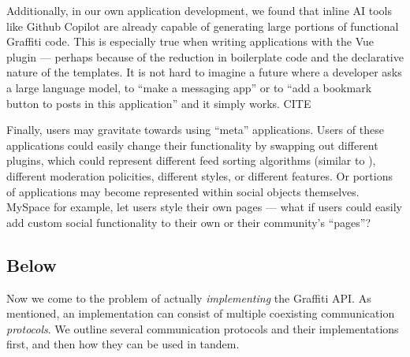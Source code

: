 Additionally, in our own application development,
we found that inline AI tools like Github Copilot are already
capable of generating large portions of functional Graffiti code.
This is especially true when writing applications with the
Vue plugin --- perhaps because of the reduction in boilerplate
code and the declarative nature of the templates.
It is not hard to imagine a future where a developer asks
a large language model, to ``make a messaging app''
or to ``add a bookmark button to posts in this application'' and
it simply works. CITE

Finally, users may gravitate towards using ``meta'' applications.
Users of these applications could easily change their functionality
by swapping out different plugins,
which could represent different feed sorting algorithms
(similar to \cite{threeleggedstool, bluesky}),
different moderation policities, different styles,
or different features.
Or portions of applications may become represented within social objects themselves.
MySpace for example, let users style their own pages --- what if users could easily add
custom social functionality to their own
or their community's ``pages''?

\subsection{Below}

Now we come to the problem of actually \emph{implementing} the Graffiti API.
As mentioned, an implementation can consist of multiple coexisting communication
\emph{protocols}.
We outline several communication protocols and their implementations first,
and then how they can be used in tandem.



